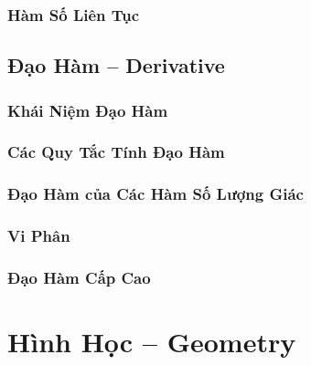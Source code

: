 \documentclass[oneside]{book}
\numberwithin{equation}{section}
\begin{document}

\section{Hàm Số Liên Tục}


\chapter{Đạo Hàm -- Derivative}

\section{Khái Niệm Đạo Hàm}


\section{Các Quy Tắc Tính Đạo Hàm}


\section{Đạo Hàm của Các Hàm Số Lượng Giác}


\section{Vi Phân}


\section{Đạo Hàm Cấp Cao}


\part{Hình Học -- Geometry}
\end{document}
